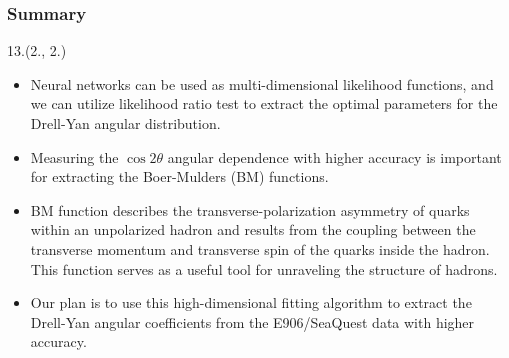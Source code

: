 \documentclass[12pt, xcolor={dvipsnames}, aspectratio = 169, sans,mathserif]{beamer}
\newenvironment{List}[2]
{\begin{textblock}{#1}#2
\begin{itemize}}
{\end{itemize}
\end{textblock}}
\begin{document}
\begin{frame}
\frametitle{Summary}

\begin{List}{13.}{(2., 2.)}

  \item Neural networks can be used as multi-dimensional likelihood functions, and we can utilize likelihood ratio test
  to extract the optimal parameters for the Drell-Yan angular distribution.

  \item Measuring the $\cos2\theta$ angular dependence with higher accuracy is important for extracting the Boer-Mulders
  (BM) functions.

  \item BM function describes the transverse-polarization asymmetry of quarks within an unpolarized hadron and results
  from the coupling between the transverse momentum and transverse spin of the quarks inside the hadron. This function
  serves as a useful tool for unraveling the structure of hadrons.

  \item Our plan is to use this high-dimensional fitting algorithm to extract the Drell-Yan angular coefficients from the
  E906/SeaQuest data with higher accuracy.

\end{List}

\end{frame}
\end{document}
